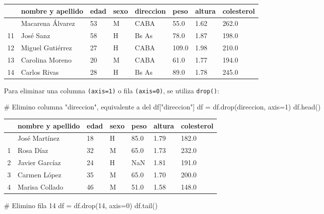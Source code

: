 \documentclass[
  letterpaper,
  DIV=11,
  numbers=noendperiod]{scrreprt}
\newenvironment{Shaded}{\begin{snugshade}}{\end{snugshade}}
\newcommand{\CommentTok}[1]{\textcolor[rgb]{0.37,0.37,0.37}{#1}}
\newcommand{\DecValTok}[1]{\textcolor[rgb]{0.68,0.00,0.00}{#1}}
\newcommand{\NormalTok}[1]{\textcolor[rgb]{0.00,0.23,0.31}{#1}}
\newcommand{\OperatorTok}[1]{\textcolor[rgb]{0.37,0.37,0.37}{#1}}
\newcommand{\StringTok}[1]{\textcolor[rgb]{0.13,0.47,0.30}{#1}}
\begin{document}
\begin{longtable}[]{@{}llllllll@{}}
\toprule\noalign{}
& nombre y apellido & edad & sexo & direccion & peso & altura &
colesterol \\
\midrule\noalign{}
\endhead
\bottomrule\noalign{}
\endlastfoot
10 & Macarena Álvarez & 53 & M & CABA & 55.0 & 1.62 & 262.0 \\
11 & José Sanz & 58 & H & Bs As & 78.0 & 1.87 & 198.0 \\
12 & Miguel Gutiérrez & 27 & H & CABA & 109.0 & 1.98 & 210.0 \\
13 & Carolina Moreno & 20 & M & CABA & 61.0 & 1.77 & 194.0 \\
14 & Carlos Rivas & 28 & H & Bs As & 89.0 & 1.78 & 245.0 \\
\end{longtable}

Para eliminar una columna \texttt{(axis=1)} o fila \texttt{(axis=0)}, se
utiliza \texttt{drop()}:

\begin{Shaded}
\begin{Highlighting}[]
\CommentTok{\# Elimino columna "direccion", equivalente a del df["direccion"]}
\NormalTok{df }\OperatorTok{=}\NormalTok{ df.drop(}\StringTok{\textquotesingle{}direccion\textquotesingle{}}\NormalTok{, axis}\OperatorTok{=}\DecValTok{1}\NormalTok{)  }
\NormalTok{df.head()}
\end{Highlighting}
\end{Shaded}

\begin{longtable}[]{@{}lllllll@{}}
\toprule\noalign{}
& nombre y apellido & edad & sexo & peso & altura & colesterol \\
\midrule\noalign{}
\endhead
\bottomrule\noalign{}
\endlastfoot
0 & José Martínez & 18 & H & 85.0 & 1.79 & 182.0 \\
1 & Rosa Díaz & 32 & M & 65.0 & 1.73 & 232.0 \\
2 & Javier Garcíaz & 24 & H & NaN & 1.81 & 191.0 \\
3 & Carmen López & 35 & M & 65.0 & 1.70 & 200.0 \\
4 & Marisa Collado & 46 & M & 51.0 & 1.58 & 148.0 \\
\end{longtable}

\begin{Shaded}
\begin{Highlighting}[]
\CommentTok{\# Elimino fila 14}
\NormalTok{df }\OperatorTok{=}\NormalTok{ df.drop(}\DecValTok{14}\NormalTok{, axis}\OperatorTok{=}\DecValTok{0}\NormalTok{) }
\NormalTok{df.tail()}
\end{Highlighting}
\end{Shaded}
\end{document}
